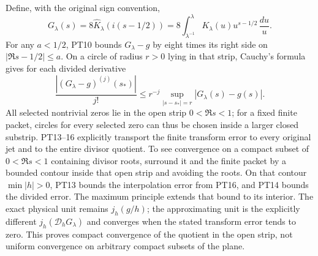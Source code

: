 \documentclass[11pt]{article}
\begin{document}
Define, with the original sign convention,
\begin{equation}\tag{PT15}
 G_\lambda(s)=8\widehat K_\lambda(i(s-1/2))
       =8\int_{\lambda^{-1}}^\lambda K_\lambda(u)
                                         u^{s-1/2}\,\frac{du}{u}.
\end{equation}
For any $a<1/2$, PT10 bounds $G_\lambda-g$ by eight times
its right side on $|\Re s-1/2|\leq a$. On a circle of radius
$r>0$ lying in that strip, Cauchy's formula gives for each
divided derivative
\begin{equation}\tag{PT16}
 \frac{|(G_\lambda-g)^{(j)}(s_*)|}{j!}
       \leq r^{-j}\sup_{|s-s_*|=r}|G_\lambda(s)-g(s)|.
\end{equation}
All selected nontrivial zeros lie in the open strip $0<\Re s<1$;
for a fixed finite packet, circles for every selected zero can
thus be chosen inside a larger closed substrip. PT13--16
explicitly transport the finite transform error to every original
jet and to the entire divisor quotient. To see convergence on a
compact subset of $0<\Re s<1$ containing divisor roots, surround
it and the finite packet by a bounded contour inside that open strip
and avoiding the roots. On that contour $\min|h|>0$,
PT13 bounds the interpolation error from PT16, and PT14 bounds
the divided error. The maximum principle extends that bound
to its interior. The exact physical unit remains $j_h(g/h)$;
the approximating unit is the explicitly different
$j_h(\mathcal D_hG_\lambda)$ and converges when the stated
transform error tends to zero.
This proves compact convergence of the quotient in the open strip,
not uniform convergence on arbitrary compact subsets of the plane.
\end{document}
